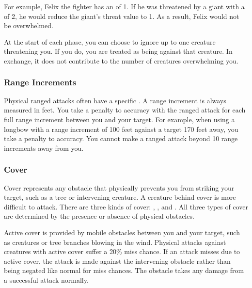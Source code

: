             For example, Felix the fighter has an  of 1.
            If he was threatened by a giant with a  of 2, he would reduce the giant's threat value to 1.
            As a result, Felix would not be overwhelmed.

             At the start of each phase, you can choose to ignore up to one creature threatening you.
            If you do, you are treated as being \unaware against that creature.
            In exchange, it does not contribute to the number of creatures overwhelming you.

        \subsubsection{Range Increments}\label{Range Increments}
            Physical ranged attacks often have a specific .
            A range increment is always measured in feet.
            You take a  penalty to accuracy with the ranged attack for each full range increment between you and your target.
            For example, when using a longbow with a range increment of 100 feet against a target 170 feet away, you take a  penalty to accuracy.
            You cannot make a ranged attack beyond 10 range increments away from you.

        \subsubsection{Cover}\label{Cover}

            Cover represents any obstacle that physically prevents you from striking your target, such as a tree or intervening creature.
            A creature behind cover is more difficult to attack.
            There are three kinds of cover: , , and .
            All three types of cover are determined by the presence or absence of physical obstacles.

            \label{Active Cover} Active cover is provided by mobile obstacles between you and your target, such as creatures or tree branches blowing in the wind.
            Physical attacks against creatures with active cover suffer a 20\% miss chance.
            If an attack misses due to active cover, the attack is made against the intervening obstacle rather than being negated like normal for miss chances.
            The obstacle takes any damage from a successful attack normally.

